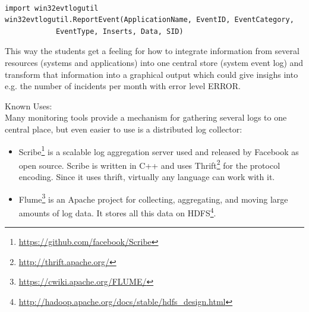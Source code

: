 \lstset{language=Python}

\begin{lstlisting}

import win32evtlogutil
win32evtlogutil.ReportEvent(ApplicationName, EventID, EventCategory,
    		EventType, Inserts, Data, SID)

\end{lstlisting}


This way the students get a feeling for how to integrate information from several resources (systems and applications) into one central store (system event log) and transform that information into a graphical output which could give insighs into e.g. the number of incidents per month with error level ERROR.

Known Uses:\\
Many monitoring tools provide a mechanism for gathering several logs to one central place, but even easier to use is a distributed log collector:
\begin{itemize}
	\item Scribe\footnote{\url{https://github.com/facebook/Scribe}} is a scalable log aggregation server used and released by Facebook as open source. Scribe is written in C++ and uses Thrift\footnote{\url{http://thrift.apache.org/}} for the protocol encoding. Since it uses thrift, virtually any language can work with it.
	\item Flume\footnote{\url{https://cwiki.apache.org/FLUME/}} is an Apache project for collecting, aggregating, and moving large amounts of log data. It stores all this data on HDFS\footnote{\url{http://hadoop.apache.org/docs/stable/hdfs_design.html}}.
\end{itemize}




